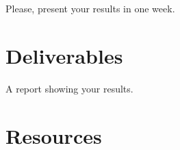 Please, present your results in one week.

\section{Deliverables}

A report showing your results.

\section{Resources}



\begin{comment}

  The Figure~\ref{fig:transform_coding} shows the stages that are
  tipycally involved in a transform-based signal compression system.

\begin{figure}
  \begin{center}
\begin{verbatim}
   s   +---+   w    +---+   k    +---+    c
 ----->| T |------->| Q |------->| E |-----------+
  (s)  +---+  (s)   +---+  (~s)  +---+   (~s)    |
samples   coefficients   indexes      code-words ~
                                                 :
                                                 ~
   ~s  +---+    w   +---+   k    +---+           |
 <-----| t |<-------| q |<-------| D |<----------+
  (~s) +---+  (~s)  +---+  (~s)  +---+
approx.    quantized     indexes
samples   coefficients
\end{verbatim}                
  \end{center}
  \caption{Common data-flow used un Transform Coding. $s$ represents
    the signal to compress, $\tilde{s}$ the lossy version of the
    reconstructed signal, $T$ the (forward) transform (which takes blocks of
    samples) producing blocks of coefficients $w$, $Q$ the scalar
    quantization stage (which takes single coefficients) producing
    quantization indexes $k$, $E$ the entropy encoder (which in our
    case (DEFLATE) works with blocks of coefficients) producing
    code-words $c$, $D$ the entropy decoder, $q$ the decuantization
    stage, and $t$ the inverse (or backward) transform. PCM stands for Puse Code
    Modulation and DEFLATE is the technique used to find a compact
    representation of the quantized coefficients.}
  \label{fig:transform_coding}
\end{figure}
\end{comment}

